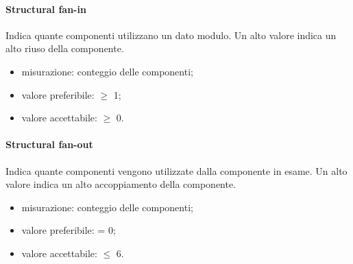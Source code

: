 			\paragraph{Structural fan-in} Indica quante componenti utilizzano un dato modulo. Un alto	valore indica un alto riuso della componente.
			\begin{itemize}
				\item misurazione: conteggio delle componenti;
				\item valore preferibile: $\geq$ 1;
				\item valore accettabile: $\geq$ 0.
			\end{itemize}
			\paragraph{Structural fan-out} Indica quante componenti vengono utilizzate dalla componente in esame. Un alto valore indica un alto accoppiamento della componente.
			\begin{itemize}
				\item misurazione: conteggio delle componenti;
				\item valore preferibile: = 0;
				\item valore accettabile: $\leq$ 6.
			\end{itemize}
		
\pagebreak
